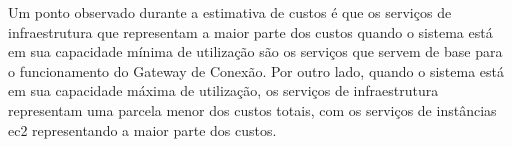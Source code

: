 Um ponto observado durante a estimativa de custos é que os serviços de infraestrutura que representam a maior parte dos custos quando o sistema está em sua capacidade mínima de utilização são os serviços que servem de base para o funcionamento do Gateway de Conexão. Por outro lado, quando o sistema está em sua capacidade máxima de utilização, os serviços de infraestrutura representam uma parcela menor dos custos totais, com os serviços de instâncias \gls{ec2} representando a maior parte dos custos.